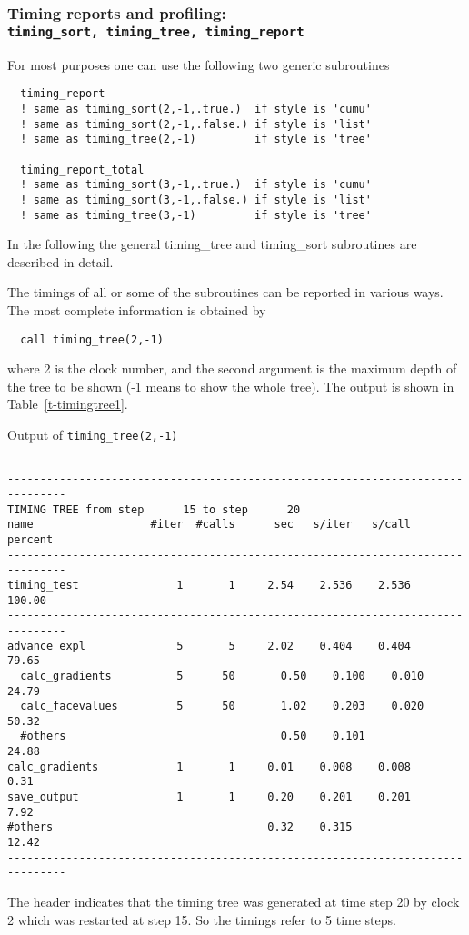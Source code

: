 \subsubsection{Timing reports and profiling: \\
      {\tt timing\_sort, timing\_tree, timing\_report}}

For most purposes one can use the following two generic subroutines
\begin{verbatim}
  timing_report  
  ! same as timing_sort(2,-1,.true.)  if style is 'cumu'
  ! same as timing_sort(2,-1,.false.) if style is 'list'
  ! same as timing_tree(2,-1)         if style is 'tree'

  timing_report_total
  ! same as timing_sort(3,-1,.true.)  if style is 'cumu'
  ! same as timing_sort(3,-1,.false.) if style is 'list'
  ! same as timing_tree(3,-1)         if style is 'tree'
\end{verbatim}
In the following the general timing\_tree and timing\_sort
subroutines are described in detail. 

The timings of all or some of the subroutines can be reported
in various ways. The most complete information is obtained by
\begin{verbatim}
  call timing_tree(2,-1)
\end{verbatim}
where 2 is the clock number, and the second argument is the maximum
depth of the tree to be shown (-1 means to show the whole tree).
The output is shown in Table~\ref{t-timingtree1}.
\begin{table}
\caption{Output of {\tt timing\_tree(2,-1)}}
{\footnotesize
\begin{verbatim}

-------------------------------------------------------------------------------
TIMING TREE from step      15 to step      20
name                  #iter  #calls      sec   s/iter   s/call  percent
-------------------------------------------------------------------------------
timing_test               1       1     2.54    2.536    2.536   100.00
-------------------------------------------------------------------------------
advance_expl              5       5     2.02    0.404    0.404    79.65
  calc_gradients          5      50       0.50    0.100    0.010    24.79
  calc_facevalues         5      50       1.02    0.203    0.020    50.32
  #others                                 0.50    0.101             24.88
calc_gradients            1       1     0.01    0.008    0.008     0.31
save_output               1       1     0.20    0.201    0.201     7.92
#others                                 0.32    0.315             12.42
-------------------------------------------------------------------------------

\end{verbatim}
}
\label{t-timingtree1}
\end{table}
The header indicates that the timing tree was generated at time step 20
by clock 2 which was restarted at step 15. So the timings refer to
5 time steps. 


